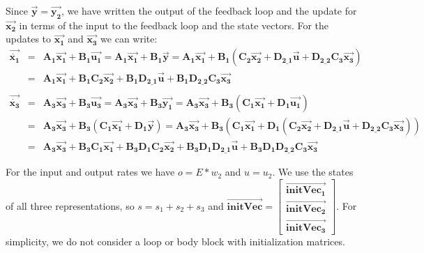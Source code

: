    Since $\vec{\mathbf{y}} = \vec{\mathbf{y_2}}$, we have written
the output of the feedback loop and the update for
$\vec{\mathbf{x_2}}$ in terms of the input to the feedback loop
and the state vectors. For the updates to $\vec{\mathbf{x_1}}$ and
$\vec{\mathbf{x_3}}$ we can write:
\begin{eqnarray*}
\vec{\dot{\mathbf{x_1}}} & = & \mathbf{A_1} \vec{\mathbf{x_1}} +
\mathbf{B_1} \vec{\mathbf{u_1}} = \mathbf{A_1}\vec{\mathbf{x_1}} +
\mathbf{B_1} \vec{\mathbf{y}} =  \mathbf{A_1}\vec{\mathbf{x_1}} +
\mathbf{B_1}(\mathbf{C_2}\vec{\mathbf{x_2}} + \mathbf{D_{2\_1}}
\vec{\mathbf{u}} + \mathbf{D_{2\_2}} \mathbf{C_3}
\vec{\mathbf{x_3}}) \\
& = & \mathbf{A_1}\vec{\mathbf{x_1}} +
\mathbf{B_1}\mathbf{C_2}\vec{\mathbf{x_2}} + \mathbf{B_1}
\mathbf{D_{2\_1}} \vec{\mathbf{u}} + \mathbf{B_1}
\mathbf{D_{2\_2}} \mathbf{C_3} \vec{\mathbf{x_3}} \\ \\
\vec{\dot{\mathbf{x_3}}} & = & \mathbf{A_3} \vec{\mathbf{x_3}} +
\mathbf{B_3} \vec{\mathbf{u_3}} = \mathbf{A_3}\vec{\mathbf{x_3}} +
\mathbf{B_3} \vec{\mathbf{y_1}} =  \mathbf{A_3}\vec{\mathbf{x_3}}
+ \mathbf{B_3}(\mathbf{C_1}\vec{\mathbf{x_1}} + \mathbf{D_1}
\vec{\mathbf{u_1}}) \\
& = & \mathbf{A_3}\vec{\mathbf{x_3}} +
\mathbf{B_3}(\mathbf{C_1}\vec{\mathbf{x_1}} +
\mathbf{D_1}\vec{\mathbf{y}}) = \mathbf{A_3}\vec{\mathbf{x_3}} +
\mathbf{B_3}(\mathbf{C_1}\vec{\mathbf{x_1}} +
\mathbf{D_1}(\mathbf{C_2}\vec{\mathbf{x_2}} + \mathbf{D_{2\_1}}
\vec{\mathbf{u}} + \mathbf{D_{2\_2}} \mathbf{C_3}
\vec{\mathbf{x_3}})) \\
& = & \mathbf{A_3}\vec{\mathbf{x_3}} +
\mathbf{B_3}\mathbf{C_1}\vec{\mathbf{x_1}} +
\mathbf{B_3}\mathbf{D_1}\mathbf{C_2}\vec{\mathbf{x_2}} +
\mathbf{B_3}\mathbf{D_1}\mathbf{D_{2\_1}} \vec{\mathbf{u}} +
\mathbf{B_3}\mathbf{D_1}\mathbf{D_{2\_2}} \mathbf{C_3}
\vec{\mathbf{x_3}}
\end{eqnarray*}

    For the input and output rates we have $o = E * w_2$
and $u = u_2$. We use the states of all three representations, so
$s = s_1 + s_2 + s_3$ and $\overrightarrow{\mathbf{initVec}} =
\left [ \begin{array} {c} \overrightarrow{\mathbf{initVec_1}} \\
\overrightarrow{\mathbf{initVec_2}} \\
\overrightarrow{\mathbf{initVec_3}} \end{array} \right ]$. For
simplicity, we do not consider a loop or body block with
initialization matrices.


